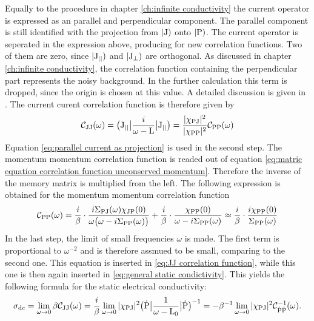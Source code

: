 %
Equally to the procedure in chapter \ref{ch:infinite conductivity} the current operator is expressed as an parallel and perpendicular component.
The parallel component is still identified with the projection from $|\mathrm{J})$ onto $|\mathrm{P})$.
The current operator is seperated in the expression above, producing for new correlation functions.
Two of them are zero, since $|\mathrm{\mathrm{J}_{\mid\mid}})$ and $|\mathrm{\mathrm{J}_{\bot}})$ are orthogonal.
As discussed in chapter \ref{ch:infinite conductivity}, the correlation function containing the perpendicular part represents the noisy background.
In the further calculation this term is dropped, since the origin is chosen at this value.
A detailed discussion is given in \cite{Jung}.
The current curent correlation function is therefore given by
%
\begin{align}
	\mathcal{C}_{\mathrm{JJ}}(\omega) = \big({\mathrm{J}_{\mid\mid}}\big| \frac{i}{\omega - \mathrm{L}} \big|{\mathrm{J}_{\mid\mid}}\big) = \frac{\vert\chi_{\mathrm{PJ}}\vert^{2}}{\vert\chi_{\mathrm{PP}}\vert^{2}} \mathcal{C}_{\mathrm{PP}}(\omega)
	\label{eq:JJ correlation function}
\end{align}
%
Equation \eqref{eq:parallel current as projection} is used in the second step.
The momentum momentum correlation function is readed out of equation \eqref{eq:matric equation correlation function unconserved momentum}.
Therefore the inverse of the memory matrix is multiplied from the left.
The following expression is obtained for the momentum momentum correlation function
%
\begin{align}
	\mathcal{C}_{\mathrm{PP}}(\omega) = \frac{i}{\beta} \cdot \frac{i \Sigma_{\mathrm{PJ}}(\omega)  \chi_{\mathrm{JP}}(0)}{\omega\big(\omega - i\Sigma_{\mathrm{PP}}(\omega)\big)} + \frac{i}{\beta} \cdot \frac{\chi_{\mathrm{PP}}(0)}{\omega - i\Sigma_{\mathrm{PP}}(\omega)} \approx \frac{i}{\beta} \cdot \frac{i \chi_{\mathrm{PP}}(0)}{\Sigma_{\mathrm{PP}}(\omega)}
\end{align}
%
In the last step, the limit of small frequencies $\omega$ is made.
The first term is proportional to $\omega^{-2}$ and is therefore assmued to be small, comparing to the second one.
This equation is inserted in \eqref{eq:JJ correlation function}, while this one is then again inserted in \eqref{eq:general static condictivity}.
This yields the following formula for the static electrical conductivity:
%
\begin{align}
	\sigma_{\mathrm{dc}} = \lim\limits_{\omega \to 0} \beta \mathcal{C}_{\mathrm{JJ}}(\omega) = \frac{i}{\beta} \lim\limits_{\omega \to 0} \vert\chi_{\mathrm{PJ}}\vert^{2} \big({\dot{\mathrm{P}}}\big| \frac{1}{\omega - \mathrm{L_{0}}} \big|{\dot{\mathrm{P}}}\big)^{-1} = -\beta^{-1} \lim\limits_{\omega \to 0} \vert\chi_{\mathrm{PJ}}\vert^{2} \mathcal{C}_{\dot{\mathrm{P}} \dot{\mathrm{P}}}^{-1}(\omega).
\end{align}

